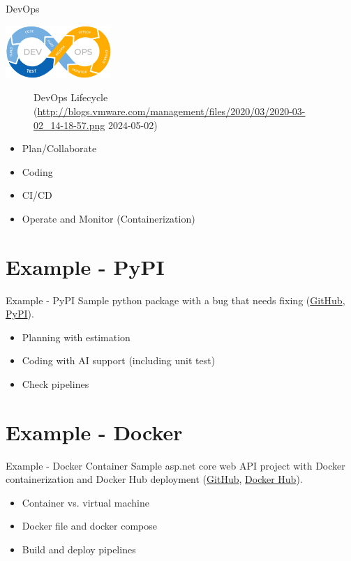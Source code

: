 \documentclass[10pt]{beamer}
\begin{document}
\begin{frame}{DevOps}
	\begin{center}
		\includegraphics[width=4cm]{devops_lifecycle.png}
			\begin{figure}
				\caption{DevOps Lifecycle (\url{http://blogs.vmware.com/management/files/2020/03/2020-03-02_14-18-57.png} 2024-05-02)}
			\end{figure}
	\end{center}

	\begin{itemize}
		\item Plan/Collaborate
		\item Coding
		\item CI/CD
		\item Operate and Monitor (Containerization)
	\end{itemize}
\end{frame}


\section{Example - PyPI}
\begin{frame}{Example - PyPI}
	Sample python package with a bug that needs fixing (\href{https://github.com/OliverZott/python-devops-example}{\color{blue}GitHub}, \href{https://pypi.org/project/velosaurus-calc/}{\color{blue}PyPI}).

	\begin{itemize}
		\item Planning with estimation
		\item Coding with AI support (including unit test)
		\item Check pipelines
	\end{itemize}
\end{frame}


\section{Example - Docker}
\begin{frame}{Example - Docker Container}
	Sample asp.net core web API project with Docker containerization and Docker Hub deployment (\href{https://github.com/OliverZott/velosaurus-backend}{\color{blue}GitHub}, \href{https://hub.docker.com/repository/docker/dasmuesli/velosaurus-backend}{\color{blue}Docker Hub}).
	
	

	\begin{itemize}
	 	\item Container vs. virtual machine
		\item Docker file and docker compose
		\item Build and deploy pipelines
	\end{itemize}
\end{frame}
\end{document}
